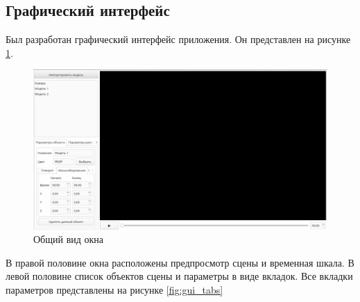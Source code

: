 \subsection{Графический интерфейс}

Был разработан графический интерфейс приложения. Он представлен на рисунке \ref{fig:gui_window}. 

\begin{figure}[h]
    \centering
    \includegraphics[width=0.9\columnwidth]{img/gui/common.png}
    \caption{Общий вид окна}
    \label{fig:gui_window}
\end{figure}

В правой половине окна расположены предпросмотр сцены и временная шкала. В левой половине список объектов сцены и параметры в виде вкладок. Все вкладки параметров представлены на рисунке \ref{fig:gui_tabs}

